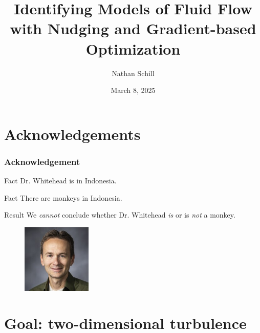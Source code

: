 \documentclass{beamer}
\title{Identifying Models of Fluid Flow with Nudging and Gradient-based Optimization}
\author{Nathan Schill}
\institute{Brigham Young University}
\date{March 8, 2025}
\newcommand\blfootnote[1]{%
  \begingroup
  \renewcommand\thefootnote{}\footnote{#1}%
  \addtocounter{footnote}{-1}%
  \endgroup
}
\begin{document}
\frame{\titlepage}

\section{Acknowledgements}

\begin{frame}
  \frametitle{Acknowledgement}
  \pause
  \begin{block}{Fact}
    Dr. \!Whitehead is in Indonesia.
  \end{block}
  \pause
  \begin{block}{Fact}
    There are monkeys in Indonesia.
  \end{block}
  \pause
  \begin{block}{Result}
    We \textit{cannot} conclude whether Dr.\! Whitehead \textit{is} or is
    \textit{not} a monkey.
  \end{block}
  \begin{figure}
    \centering
    \includegraphics[height=1.3in, keepaspectratio]{jared.jpg}
  \end{figure}
\end{frame}

\section{Goal: two-dimensional turbulence}

\end{document}
